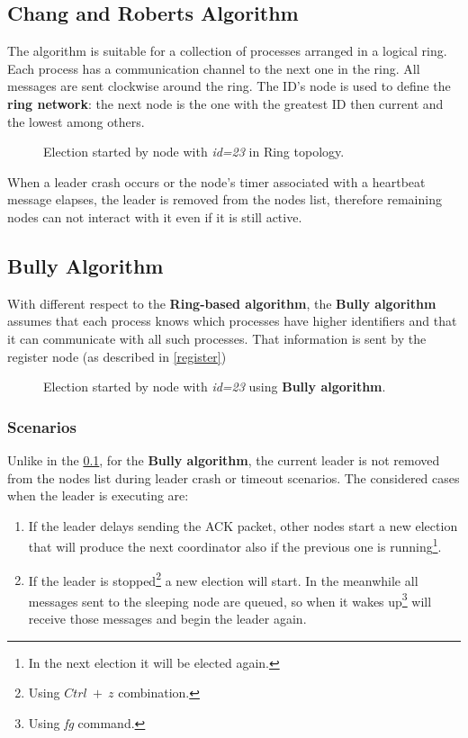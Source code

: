 \documentclass[conference]{IEEEtran}
\begin{document}
\subsection{Chang and Roberts Algorithm}\label{ring}

The algorithm is suitable for a collection of processes arranged in a logical ring. Each process has a
communication channel to the next one in the ring. All messages
are sent clockwise around the ring. The ID's node is used to define the \textbf{ring network}: the next node is the one with the greatest ID then current and the lowest among others.

\begin{figure}[htbp]
  \centering
  
  \caption{Election started by node with \textit{id=23} in Ring topology.}
\end{figure}

When a leader crash occurs or the node's timer associated with a heartbeat message elapses, the leader is removed from the nodes list, therefore remaining nodes can not interact with it even if it is still active.  

\subsection{Bully Algorithm}

With different respect to the \textbf{Ring-based algorithm}, the \textbf{Bully algorithm} assumes that each process knows which processes have higher identifiers and that it can communicate with all such processes. That information is sent by the register node (as described in \ref{register}) 

\begin{figure}[htbp]
  \centering
  
  \caption{Election started by node with \textit{id=23} using \textbf{Bully algorithm}.}
\end{figure}

\subsubsection{Scenarios}

Unlike in the \ref{ring}, for the \textbf{Bully algorithm}, the current leader is not removed from the nodes list during leader crash or timeout scenarios.
The considered cases when the leader is executing are:  

\begin{enumerate}
    \item If the leader delays sending the ACK packet, other nodes start a new election that will produce the next coordinator also if the previous one is running\footnote{In the next election it will be elected again.}.
    \item If the leader is stopped\footnote{Using $Ctrl\ +\ z$ combination.} a new election will start. In the meanwhile all messages sent to the sleeping node are queued, so when it wakes up\footnote{Using \textit{fg} command.} will receive those messages and begin the leader again.
\end{enumerate}
\end{document}
